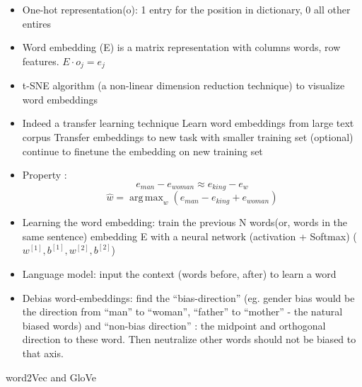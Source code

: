 \documentclass[11pt, openany]{book}              %
\DeclareMathOperator*{\argmax}{arg\,max}  %
\begin{document}
\begin{itemize}
    \item One-hot representation(o): 1 entry for the position in dictionary, 0 all other entires
    \item Word embedding (E) is a matrix representation with columns words, row features.  $E \cdot o_j = e_j$
    \item t-SNE algorithm (a non-linear dimension reduction technique) to visualize word embeddings
    \item Indeed a transfer learning technique
    	\subitem Learn word embeddings from large text corpus
    	\subitem Transfer embeddings to new task with smaller training set 
    	\subitem (optional) continue to finetune the embedding on new training set
	\item Property : 
		$$e_{man} - e_{woman}  \approx e_{king} - e_{w}$$
		$$\hat{w} = \argmax_{w} (e_{man}  - e_{king} +e_{woman}) $$
	\item Learning the word embedding: train the previous N words(or, words in the same sentence) embedding E with a neural network (activation + Softmax) ( $w^{[1]}, b^{[1]}, w^{[2]}, b^{[2]}$) 
	\item Language model: input the context (words before, after) to learn a word 
	\item Debias word-embeddings: find the “bias-direction” (eg. gender bias would be the direction from “man” to “woman”, “father” to “mother” - the natural biased words) and “non-bias direction” : the midpoint and orthogonal direction to these word. Then neutralize other words should not be biased to that axis. 
\end{itemize}

word2Vec and GloVe
\end{document}
